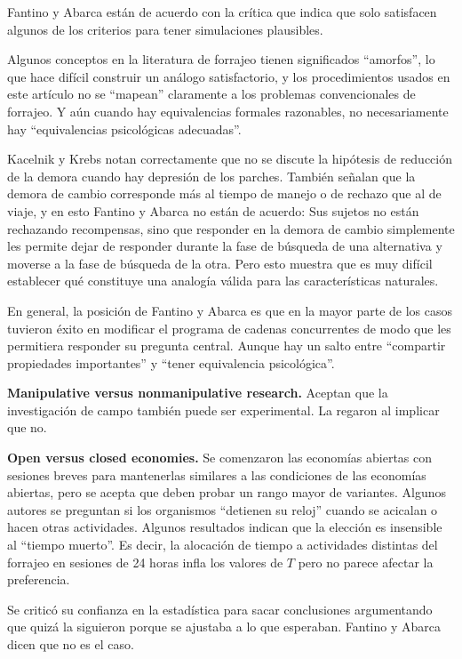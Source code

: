 \documentclass[a4paper,12pt]{article}
\begin{document}
Fantino y Abarca están de acuerdo con la crítica que indica que solo satisfacen algunos de los criterios para tener simulaciones plausibles.

Algunos conceptos en la literatura de forrajeo tienen significados ``amorfos'', lo que hace difícil construir un análogo satisfactorio, y los procedimientos usados en este artículo no se ``mapean'' claramente a los problemas convencionales de forrajeo. Y aún cuando hay equivalencias formales razonables, no necesariamente hay ``equivalencias psicológicas adecuadas''. 

Kacelnik y Krebs notan correctamente que no se discute la hipótesis de reducción de la demora cuando hay depresión de los parches. También señalan que la demora de cambio corresponde más al tiempo de manejo o de rechazo que al de viaje, y en esto Fantino y Abarca no están de acuerdo: Sus sujetos no están rechazando recompensas, sino que responder en la demora de cambio simplemente les permite dejar de responder durante la fase de búsqueda de una alternativa y moverse a la fase de búsqueda de la otra. Pero esto muestra que es muy difícil establecer qué constituye una analogía válida para las características naturales.

En general, la posición de Fantino y Abarca es que en la mayor parte de los casos tuvieron éxito en modificar el programa de cadenas concurrentes de modo que les permitiera responder su pregunta central. Aunque hay un salto entre ``compartir propiedades importantes'' y ``tener equivalencia psicológica''. 

{\bfseries Manipulative versus nonmanipulative research.} Aceptan que la investigación de campo también puede ser experimental. La regaron al implicar que no.

{\bfseries Open versus closed economies.} Se comenzaron las economías abiertas con sesiones breves para mantenerlas similares a las condiciones de las economías abiertas, pero se acepta que deben probar un rango mayor de variantes. Algunos autores se preguntan si los organismos ``detienen su reloj'' cuando se acicalan o hacen otras actividades. Algunos resultados indican que la elección es insensible al ``tiempo muerto''. Es decir, la alocación de tiempo a actividades distintas del forrajeo en sesiones de 24 horas infla los valores de $T$ pero no parece afectar la preferencia.

Se criticó su confianza en la estadística para sacar conclusiones argumentando que quizá la siguieron porque se ajustaba a lo que esperaban. Fantino y Abarca dicen que no es el caso.
\end{document}
